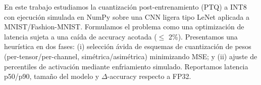 En este trabajo estudiamos la cuantización post-entrenamiento (PTQ) a INT8
con ejecución simulada en NumPy sobre una CNN ligera tipo LeNet aplicada a MNIST/Fashion-MNIST.
Formulamos el problema como una optimización de latencia sujeta a una caída de accuracy
acotada ($\leq$ 2\%). Presentamos una heurística en dos fases: (i) selección ávida de
esquemas de cuantización de pesos (per-tensor/per-channel, simétrica/asimétrica) minimizando MSE;
y (ii) ajuste de percentiles de activación mediante enfriamiento simulado.
Reportamos latencia p50/p90, tamaño del modelo y $\Delta$-accuracy respecto a FP32.
